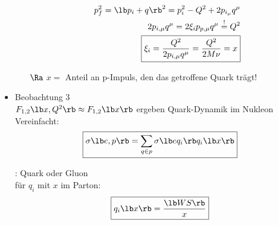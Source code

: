 \begin{itemize}
\begin{itemize}
\begin{align}
p_f^2 = \lb  p_i + q\rb ^2 =p_i^2 - Q^2 + 2p_{i_\mu}q^\mu \nonumber \\
2p_{i,\mu} q^\mu = 2 \xi_i p_{p,\mu} q^\mu \overset{!}{=}Q^2 \nonumber\\
\boxed{ \xi_i = \frac{Q^2}{2 p_{i,\mu}q^\mu} = \frac{Q^2}{2 M \nu} = x }
\end{align}
\item[$\Ra$] $x=$ Anteil an p-Impuls, den das getroffene Quark trägt!
\end{itemize}
\item Beobachtung 3\\
$F_{1,2} \lb x, Q^2\rb  \approx F_{1,2}\lb x\rb $ ergeben \glqq Quark-Dynamik im Nukleon\grqq{}\\
Vereinfacht:
\begin{align}
\boxed{ \sigma \lb  e, p \rb   = \sum_{q \in p } \sigma \lb eq_i \rb   q_i\lb x\rb }
\end{align}
: Quark oder Gluon\\
für $q_i$ mit $x$ im Parton:
\begin{align}
\boxed{q_i\lb x\rb  = \dfrac{\lb WS\rb }{x}}
\end{align}
\end{itemize}


